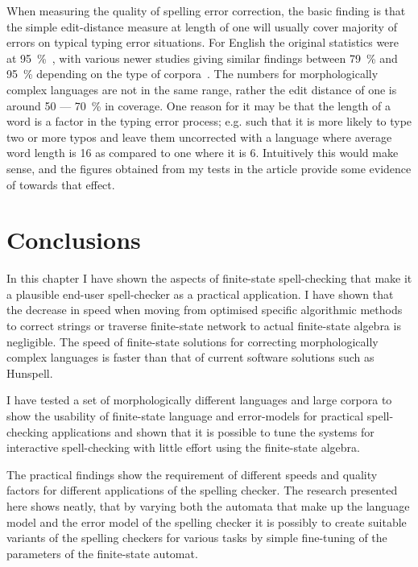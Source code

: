 \documentclass[officiallayout]{unihelcompling}
\begin{document}
When measuring the quality of spelling error correction, the basic finding is
that the simple edit-distance measure at length of one will usually cover
majority of errors on typical typing error situations. For English the original
statistics were at 95~\%~\citep{damerau1964technique}, with various newer
studies giving similar findings between 79~\% and 95~\% depending on the type
of corpora~\citep{kukich1992spelling}.  The numbers for morphologically complex
languages are not in the same range, rather the edit distance of one is around
50 --- 70~\% in coverage. One reason for it may be that the length of a word is
a factor in the typing error process; e.g. such that it is more likely to type
two or more typos and leave them uncorrected with a language where average word
length is 16 as compared to one where it is 6. Intuitively this would make
sense, and the figures obtained from my tests in the article provide some
evidence of towards that effect.

\section{Conclusions}

In this chapter I have shown the aspects of finite-state spell-checking that
make it a plausible end-user spell-checker as a practical application. I have
shown that the decrease in speed when moving from optimised specific
algorithmic methods to correct strings or traverse finite-state network to
actual finite-state algebra is negligible. The speed of finite-state solutions
for correcting morphologically complex languages is faster than
that of current software solutions such as Hunspell.

I have tested a set of morphologically different languages and
large corpora to show the usability of finite-state language and error-models
for practical spell-checking applications and shown that it is possible to tune
the systems for interactive spell-checking with little effort using the
finite-state algebra.

The practical findings show the requirement of different speeds and quality
factors for different applications of the spelling checker. The research
presented here shows neatly, that by varying both the automata that make up
the language model and the error model of the spelling checker it is possibly
to create suitable variants of the spelling checkers for various tasks by
simple fine-tuning of the parameters of the finite-state automat.
\end{document}
